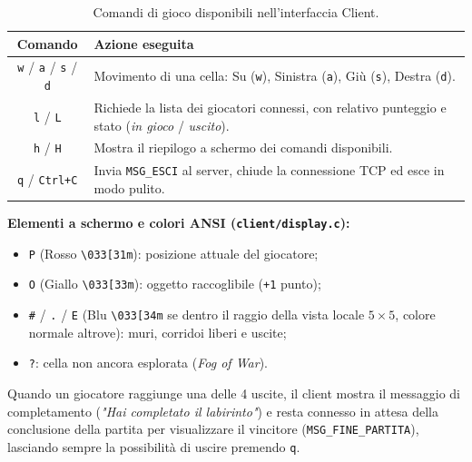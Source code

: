 \documentclass[11pt,a4paper]{article}
\begin{document}
\begin{table}[htbp]
\centering
\begin{tabularx}{\textwidth}{c X}
\toprule
\textbf{Comando} & \textbf{Azione eseguita} \\
\midrule
\texttt{w} / \texttt{a} / \texttt{s} / \texttt{d} & Movimento di una cella: Su (\texttt{w}), Sinistra (\texttt{a}), Giù (\texttt{s}), Destra (\texttt{d}). \\
\texttt{l} / \texttt{L} & Richiede la lista dei giocatori connessi, con relativo punteggio e stato (\textit{in gioco} / \textit{uscito}). \\
\texttt{h} / \texttt{H} & Mostra il riepilogo a schermo dei comandi disponibili. \\
\texttt{q} / \texttt{Ctrl+C} & Invia \texttt{MSG\_ESCI} al server, chiude la connessione TCP ed esce in modo pulito. \\
\bottomrule
\end{tabularx}
\caption{Comandi di gioco disponibili nell'interfaccia Client.}
\label{tab:client-commands}
\end{table}

\textbf{Elementi a schermo e colori ANSI (\texttt{client/display.c}):}
\begin{itemize}
    \item \texttt{P} (Rosso \texttt{\textbackslash 033[31m}): posizione attuale del giocatore;
    \item \texttt{O} (Giallo \texttt{\textbackslash 033[33m}): oggetto raccoglibile (\texttt{+1} punto);
    \item \texttt{\#} / \texttt{.} / \texttt{E} (Blu \texttt{\textbackslash 033[34m} se dentro il raggio della vista locale $5\times 5$, colore normale altrove): muri, corridoi liberi e uscite;
    \item \texttt{?}: cella non ancora esplorata (\textit{Fog of War}).
\end{itemize}

Quando un giocatore raggiunge una delle 4 uscite, il client mostra il messaggio di completamento (\textit{"Hai completato il labirinto"}) e resta connesso in attesa della conclusione della partita per visualizzare il vincitore (\texttt{MSG\_FINE\_PARTITA}), lasciando sempre la possibilità di uscire premendo \texttt{q}.

\clearpage

\end{document}
